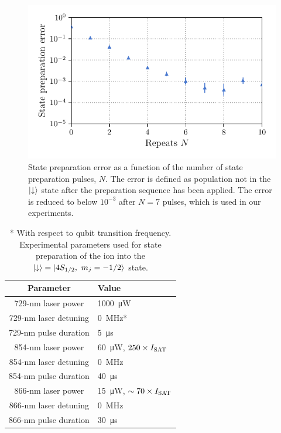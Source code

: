     \begin{figure}
        \begin{center}
        \noindent\includegraphics[width=0.75\linewidth]{
            figures/pdf_figure/state_prep.pdf
            }
        \end{center}
        \caption{
            State preparation error as a function of the number of state preparation pulses, $N$. The error is defined as population not in the $\ket{\downarrow}$ state after the preparation sequence has been applied. The error is reduced to below $10^{-3}$ after $N=7$ pulses, which is used in our experiments.
            }
        \label{fig:stateprep}
    \end{figure}

\begin{table}
    \begin{center}
    \begin{tabular}{|c|l|}
        \hline
        Parameter & Value \\
        \hline
        729-nm laser power & 1000~\unit{\uW}\\
        729-nm laser detuning & 0~\unit{\MHz}* \\
        729-nm pulse duration & 5~\unit{\us} \\
        854-nm laser power & 60~\unit{\uW}, $250\times I_{\rm SAT}$\\
        854-nm laser detuning & 0~\unit{\MHz} \\
        854-nm pulse duration & 40~\unit{\us} \\
        866-nm laser power & 15~\unit{\uW}, $\sim 70\times I_{\rm SAT}$\\
        866-nm laser detuning & 0~\unit{\MHz} \\
        866-nm pulse duration & 30~\unit{\us} \\
        \hline
    \end{tabular}
    \end{center}
    \caption{
        * With respect to qubit transition frequency.\\
        Experimental parameters used for state preparation of the ion into the $\ket{\downarrow} = \ket{4S_{1/2},~m_j = -1/2}$ state.
        }
    \label{tab:state_prep_parameters}
\end{table}

